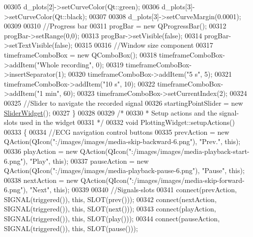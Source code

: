 \begin{DoxyCode}
00305     d\_plots[2]->setCurveColor(Qt::green);
00306     d\_plots[3]->setCurveColor(Qt::black);
00307 
00308     d\_plots[3]->setCurveMargin(0.0001);
00309 
00310     \textcolor{comment}{//Progress bar}
00311     progBar = \textcolor{keyword}{new} QProgressBar();
00312     progBar->setRange(0,0);
00313     progBar->setVisible(\textcolor{keyword}{false});
00314     progBar->setTextVisible(\textcolor{keyword}{false});
00315 
00316     \textcolor{comment}{//Window size component}
00317     timeframeComboBox = \textcolor{keyword}{new} QComboBox();
00318     timeframeComboBox->addItem(\textcolor{stringliteral}{"Whole recording"}, 0);
00319     timeframeComboBox->insertSeparator(1);
00320     timeframeComboBox->addItem(\textcolor{stringliteral}{"5 s"}, 5);
00321     timeframeComboBox->addItem(\textcolor{stringliteral}{"10 s"}, 10);
00322     timeframeComboBox->addItem(\textcolor{stringliteral}{"1 min"}, 60);
00323     timeframeComboBox->setCurrentIndex(2);
00324 
00325     \textcolor{comment}{//Slider to navigate the recorded signal}
00326     startingPointSlider = \textcolor{keyword}{new} \hyperlink{classSliderWidget}{SliderWidget}();
00327 \}
00328 
00329 \textcolor{comment}{/*}
00330 \textcolor{comment}{ * Setup actions and the signal-slots used in the widget}
00331 \textcolor{comment}{ */}
00332 \textcolor{keywordtype}{void} PlottingWidget::setupActions()
00333 \{
00334     \textcolor{comment}{//ECG navigation control buttons}
00335     prevAction = \textcolor{keyword}{new} QAction(QIcon(\textcolor{stringliteral}{":/images/images/media-skip-backward-6.png"}), \textcolor{stringliteral}{"Prev."}, \textcolor{keyword}{this});
00336     playAction = \textcolor{keyword}{new} QAction(QIcon(\textcolor{stringliteral}{":/images/images/media-playback-start-6.png"}), \textcolor{stringliteral}{"Play"}, \textcolor{keyword}{this});
00337     pauseAction = \textcolor{keyword}{new} QAction(QIcon(\textcolor{stringliteral}{":/images/images/media-playback-pause-6.png"}), \textcolor{stringliteral}{"Pause"}, \textcolor{keyword}{this});
00338     nextAction = \textcolor{keyword}{new} QAction(QIcon(\textcolor{stringliteral}{":/images/images/media-skip-forward-6.png"}), \textcolor{stringliteral}{"Next"}, \textcolor{keyword}{this});
00339 
00340     \textcolor{comment}{//Signals-slots}
00341     connect(prevAction, SIGNAL(triggered()), \textcolor{keyword}{this}, SLOT(prev()));
00342     connect(nextAction, SIGNAL(triggered()), \textcolor{keyword}{this}, SLOT(next()));
00343     connect(playAction, SIGNAL(triggered()), \textcolor{keyword}{this}, SLOT(play()));
00344     connect(pauseAction, SIGNAL(triggered()), \textcolor{keyword}{this}, SLOT(pause()));

\end{DoxyCode}
